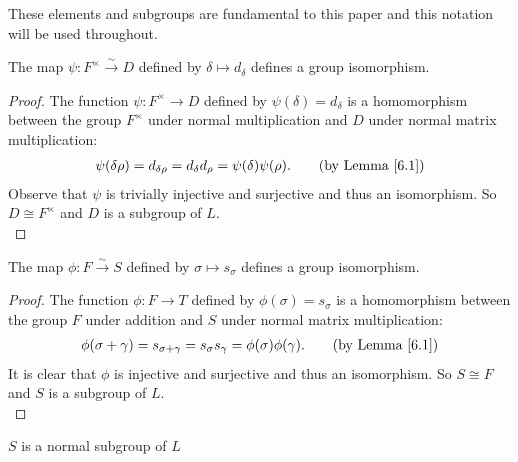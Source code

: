 These elements and subgroups are fundamental to this paper and this notation will be used throughout.

\begin{lemma}
\label{SpecialSubgroups.D_iso_units}
\leanok
The map $\psi : F^\times \overset{\sim}{\rightarrow} D$ defined by $\delta \mapsto d_\delta$ defines a group isomorphism.
\end{lemma}

\begin{proof}
    The function $\psi: F^\times \rightarrow D$ defined by $\psi(\delta) = d_\delta$ is a homomorphism between the group $F^\times$ under normal multiplication and $D$ under normal matrix multiplication:
\begin{align*} \psi(\delta \rho) = d_{\delta \rho} =  d_\delta d_\rho = \psi(\delta) \psi(\rho). \tag{by Lemma \ref{6.1}}
\end{align*}
Observe that $\psi$ is trivially injective and surjective and thus an isomorphism. So $D\cong F^\times$ and $D$ is a subgroup of $L$.\\
\end{proof}



\begin{lemma}
\label{SpecialSubgroups.S_iso_F, SpecialMatrices.s_mul_s_eq_s_add}
\leanok
    The map $\phi : F \overset{\sim}{\rightarrow} S$ defined by $\sigma \mapsto s_\sigma$ defines a group isomorphism.
\end{lemma}

\begin{proof}
     The function $\phi: F \rightarrow T$ defined by $\phi(\sigma) = s_\sigma$ is a homomorphism between the group $F$ under addition and $S$ under normal matrix multiplication:
\begin{align*} \phi(\sigma + \gamma) = s_{\sigma + \gamma} = s_\sigma s_\gamma = \phi(\sigma) \phi(\gamma). \tag{by Lemma \ref{6.1}}
\end{align*}
It is clear that $\phi$ is injective and surjective and thus an isomorphism. So $ S \cong F$ and $S$ is a subgroup of $L$. \\
\end{proof}



\begin{lemma}
\label{SpecialSubgroups.normal_S_subgroupOf_L}
\leanok
$S$ is a normal subgroup of $L$
\end{lemma}

